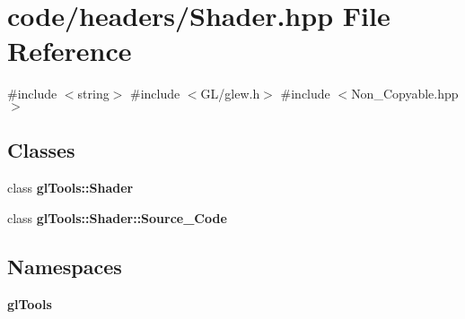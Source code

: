 \section{code/headers/\+Shader.hpp File Reference}
\label{_shader_8hpp}
{\ttfamily \#include $<$string$>$}\newline
{\ttfamily \#include $<$G\+L/glew.\+h$>$}\newline
{\ttfamily \#include $<$Non\+\_\+\+Copyable.\+hpp$>$}\newline
\subsection*{Classes}
\begin{DoxyCompactItemize}
\item 
class \textbf{ gl\+Tools\+::\+Shader}
\item 
class \textbf{ gl\+Tools\+::\+Shader\+::\+Source\+\_\+\+Code}
\end{DoxyCompactItemize}
\subsection*{Namespaces}
\begin{DoxyCompactItemize}
\item 
 \textbf{ gl\+Tools}
\end{DoxyCompactItemize}
